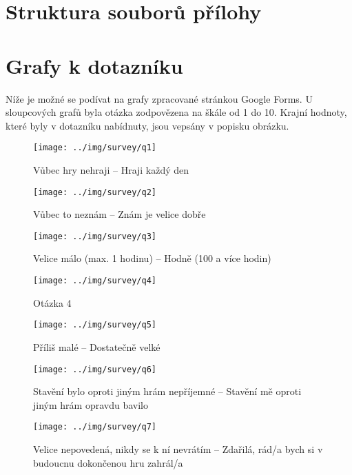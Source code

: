 

\appendix
{}

\renewcommand{\thesection}{\Alph{section}}

\section{Struktura souborů přílohy}


\section{Grafy k dotazníku}
\label{sec:survey}


Níže je možné se podívat na grafy zpracované stránkou Google Forms. U sloupcových grafů byla otázka zodpovězena na škále od 1 do 10. Krajní hodnoty, které byly v dotazníku nabídnuty, jsou vepsány v popisku obrázku.

\begin{figure}[!ht]\centering
\texttt{[image: ../img/survey/q1]}
\caption{Vůbec hry nehraji -- Hraji každý den}
\label{fig:q1}
\end{figure}
\FloatBarrier


\begin{figure}[!ht]\centering
\texttt{[image: ../img/survey/q2]}
\caption{Vůbec to neznám -- Znám je velice dobře}
\label{fig:q2}
\end{figure}
\FloatBarrier


\begin{figure}[!ht]\centering
\texttt{[image: ../img/survey/q3]}
\caption{Velice málo (max. 1 hodinu) -- Hodně (100 a více hodin)}
\label{fig:q3}
\end{figure}
\FloatBarrier


\begin{figure}[!ht]\centering
\texttt{[image: ../img/survey/q4]}
\caption{Otázka 4}
\label{fig:q4}
\end{figure}
\FloatBarrier


\begin{figure}[!ht]\centering
\texttt{[image: ../img/survey/q5]}
\caption{Příliš malé -- Dostatečně velké}
\label{fig:q5}
\end{figure}
\FloatBarrier


\begin{figure}[!ht]\centering
\texttt{[image: ../img/survey/q6]}
\caption{Stavění bylo oproti jiným hrám nepříjemné -- Stavění mě oproti jiným hrám opravdu bavilo}
\label{fig:q6}
\end{figure}
\FloatBarrier


\begin{figure}[!ht]\centering
\texttt{[image: ../img/survey/q7]}
\caption{Velice nepovedená, nikdy se k ní nevrátím -- Zdařilá, rád/a bych si v budoucnu dokončenou hru zahrál/a}
\label{fig:q7}
\end{figure}
\FloatBarrier